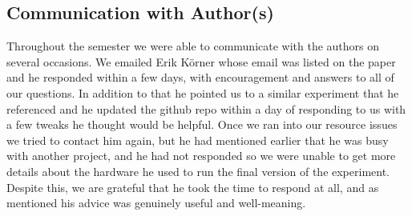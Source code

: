 \documentclass[conference]{IEEEtran}
\begin{document}
\subsection{Communication with Author(s)}
	Throughout the semester we were able to communicate with the authors on several occasions. We emailed Erik K\"{o}rner whose email was listed on the paper and he responded within a few days, with encouragement and answers to all of our questions.  In addition to that he pointed us to a similar experiment that he referenced and he updated the github repo within a day of responding to us with a few tweaks he thought would be helpful.
	Once we ran into our resource issues we tried to contact him again, but he had mentioned earlier that he was busy with another project, and he had not responded so we were unable to get more details about the hardware he used to run the final version of the experiment.
	Despite this, we are grateful that he took the time to respond at all, and as mentioned his advice was genuinely useful and well-meaning.




\vspace{12pt}
\end{document}
